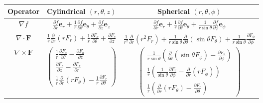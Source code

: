 \begin{table}[H]
\centering
\begin{tabular}{|c|c|c|}
\hline
\textbf{Operator} & \textbf{Cylindrical} $(r,\theta,z)$ & \textbf{Spherical} $(r,\theta,\phi)$ \\
\hline
\rule{0pt}{4ex}
$\nabla f$ & $\displaystyle\frac{\partial f}{\partial r}\mathbf{e}_r + \frac{1}{r}\frac{\partial f}{\partial \theta}\mathbf{e}_\theta + \frac{\partial f}{\partial z}\mathbf{e}_z$ & $\displaystyle\frac{\partial f}{\partial r}\mathbf{e}_r + \frac{1}{r}\frac{\partial f}{\partial \theta}\mathbf{e}_\theta + \frac{1}{r\sin\theta}\frac{\partial f}{\partial \phi}\mathbf{e}_\phi$ \\[2ex]
\hline
\rule{0pt}{4ex}
$\nabla \cdot \mathbf{F}$ & $\displaystyle\frac{1}{r}\frac{\partial}{\partial r}(rF_r) + \frac{1}{r}\frac{\partial F_\theta}{\partial \theta} + \frac{\partial F_z}{\partial z}$ & $\displaystyle\frac{1}{r^2}\frac{\partial}{\partial r}(r^2F_r) + \frac{1}{r\sin\theta}\frac{\partial}{\partial \theta}(\sin\theta F_\theta) + \frac{1}{r\sin\theta}\frac{\partial F_\phi}{\partial \phi}$ \\[2ex]
\hline
\rule{0pt}{6ex}
$\nabla \times \mathbf{F}$ & $\begin{pmatrix}
\frac{1}{r}\frac{\partial F_z}{\partial \theta} - \frac{\partial F_\theta}{\partial z} \\[1ex]
\frac{\partial F_r}{\partial z} - \frac{\partial F_z}{\partial r} \\[1ex]
\frac{1}{r}\frac{\partial}{\partial r}(rF_\theta) - \frac{1}{r}\frac{\partial F_r}{\partial \theta}
\end{pmatrix}$ & $\begin{pmatrix}
\frac{1}{r\sin\theta}\left(\frac{\partial}{\partial \theta}(\sin\theta F_\phi) - \frac{\partial F_\theta}{\partial \phi}\right) \\[1ex]
\frac{1}{r}\left(\frac{1}{\sin\theta}\frac{\partial F_r}{\partial \phi} - \frac{\partial}{\partial r}(rF_\phi)\right) \\[1ex]
\frac{1}{r}\left(\frac{\partial}{\partial r}(rF_\theta) - \frac{\partial F_r}{\partial \theta}\right)
\end{pmatrix}$ \\[6ex]
\hline
\end{tabular}
\end{table}


\newpage


\practice{}

